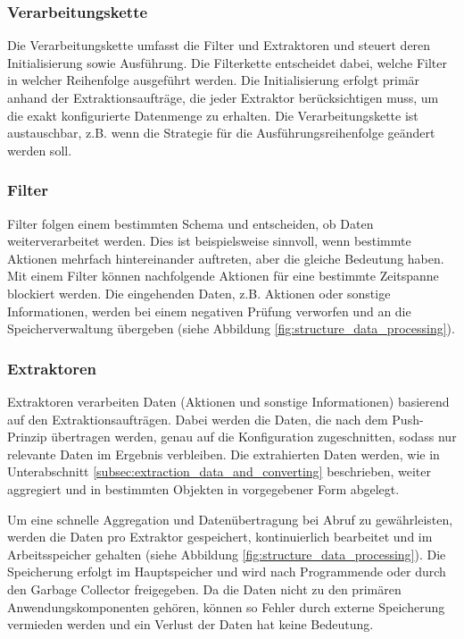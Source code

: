 \subsubsection{Verarbeitungskette}
Die Verarbeitungskette umfasst die Filter und Extraktoren und steuert deren Initialisierung sowie Ausführung. Die Filterkette entscheidet dabei, welche Filter in welcher Reihenfolge ausgeführt werden. Die Initialisierung erfolgt primär anhand der Extraktionsaufträge, die jeder Extraktor berücksichtigen muss, um die exakt konfigurierte Datenmenge zu erhalten. Die Verarbeitungskette ist austauschbar, z.B. wenn die Strategie für die Ausführungsreihenfolge geändert werden soll.

\subsubsection{Filter}
Filter folgen einem bestimmten Schema und entscheiden, ob Daten weiterverarbeitet werden. Dies ist beispielsweise sinnvoll, wenn bestimmte Aktionen mehrfach hintereinander auftreten, aber die gleiche Bedeutung haben. Mit einem Filter können nachfolgende Aktionen für eine bestimmte Zeitspanne blockiert werden. Die eingehenden Daten, z.B. Aktionen oder sonstige Informationen, werden bei einem negativen Prüfung verworfen und an die Speicherverwaltung übergeben (siehe Abbildung \ref{fig:structure_data_processing}).

\subsubsection{Extraktoren}
Extraktoren verarbeiten Daten (Aktionen und sonstige Informationen) basierend auf den Extraktionsaufträgen. Dabei werden die Daten, die nach dem Push-Prinzip übertragen werden, genau auf die Konfiguration zugeschnitten, sodass nur relevante Daten im Ergebnis verbleiben. Die extrahierten Daten werden, wie in Unterabschnitt \ref{subsec:extraction_data_and_converting} beschrieben, weiter aggregiert und in bestimmten Objekten in vorgegebener Form abgelegt.

Um eine schnelle Aggregation und Datenübertragung bei Abruf zu gewährleisten, werden die Daten pro Extraktor gespeichert, kontinuierlich bearbeitet und im Arbeitsspeicher gehalten (siehe Abbildung \ref{fig:structure_data_processing}). Die Speicherung erfolgt im Hauptspeicher und wird nach Programmende oder durch den Garbage Collector freigegeben. Da die Daten nicht zu den primären Anwendungskomponenten gehören, können so Fehler durch externe Speicherung vermieden werden und ein Verlust der Daten hat keine Bedeutung.

